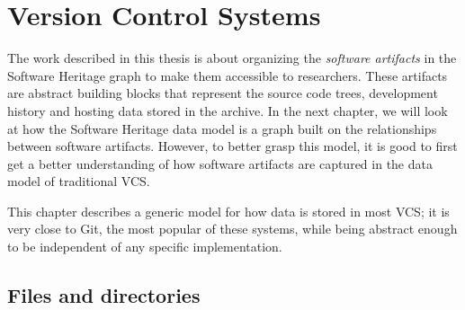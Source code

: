 \chapter{Version Control Systems}

The work described in this thesis is about organizing the \emph{software
artifacts} in the Software Heritage graph to make them accessible to
researchers. These artifacts are abstract building blocks that represent the
source code trees, development history and hosting data stored in the archive.
In the next chapter, we will look at how the Software Heritage data model is a
graph built on the relationships between software artifacts. However, to better
grasp this model, it is good to first get a better understanding of how
software artifacts are captured in the data model of traditional \gls{VCS}.

This chapter describes a generic model for how data is stored in most
\gls{VCS}; it is very close to Git, the most popular of these systems, while
being abstract enough to be independent of any specific implementation.

\section{Files and directories}


